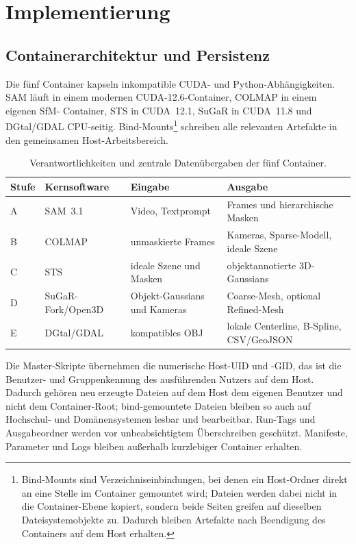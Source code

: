 \section{Implementierung}
\label{sec:implementierung}

\subsection{Containerarchitektur und Persistenz}

Die fünf Container kapseln inkompatible CUDA- und Python-Abhängigkeiten. SAM
läuft in einem modernen CUDA-12.6-Container, COLMAP in einem eigenen SfM-
Container, STS in CUDA~12.1, SuGaR in CUDA~11.8 und DGtal/GDAL CPU-seitig.
Bind-Mounts\footnote{Bind-Mounts sind Verzeichniseinbindungen, bei denen ein
Host-Ordner direkt an eine Stelle im Container gemountet wird; Dateien werden
dabei nicht in die Container-Ebene kopiert, sondern beide Seiten greifen auf
dieselben Dateisystemobjekte zu. Dadurch bleiben Artefakte nach Beendigung
des Containers auf dem Host erhalten.} schreiben alle relevanten Artefakte in
den gemeinsamen Host-Arbeitsbereich.

\begin{table}[H]
\centering
\small
\begin{tabularx}{\textwidth}{p{1.4cm}p{3.4cm}XX}
\toprule
Stufe & Kernsoftware & Eingabe & Ausgabe\\
\midrule
A & SAM~3.1 & Video, Textprompt & Frames und hierarchische Masken\\
B & COLMAP & unmaskierte Frames & Kameras, Sparse-Modell, ideale Szene\\
C & STS & ideale Szene und Masken & objektannotierte 3D-Gaussians\\
D & SuGaR-Fork/Open3D & Objekt-Gaussians und Kameras & Coarse-Mesh,
optional Refined-Mesh\\
E & DGtal/GDAL & kompatibles OBJ & lokale Centerline, B-Spline, CSV/GeoJSON\\
\bottomrule
\end{tabularx}
\caption{Verantwortlichkeiten und zentrale Datenübergaben der fünf Container.}
\label{tab:containerrollen}
\end{table}

Die Master-Skripte übernehmen die numerische Host-UID und -GID, das ist die
Benutzer- und Gruppenkennung des ausführenden Nutzers auf dem Host. Dadurch
gehören neu erzeugte Dateien auf dem Host dem eigenen Benutzer und nicht dem
Container-Root; bind-gemountete Dateien bleiben so auch auf Hochschul- und
Domänensystemen lesbar und bearbeitbar.
Run-Tags und Ausgabeordner werden vor unbeabsichtigtem Überschreiben geschützt.
Manifeste, Parameter und Logs bleiben außerhalb kurzlebiger Container erhalten.

